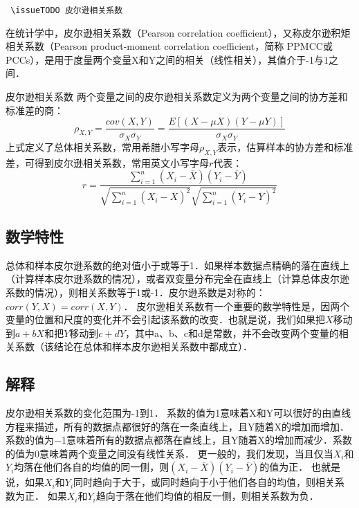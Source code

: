 
\verb | \issueTODO 皮尔逊相关系数|

在统计学中，皮尔逊相关系数（Pearson correlation coefficient），又称皮尔逊积矩相关系数（Pearson product-moment correlation coefficient，简称 PPMCC或PCCs），是用于度量两个变量X和Y之间的相关（线性相关），其值介于-1与1之间．
\begin{definition}{皮尔逊相关系数}\label{PearsR_def1}
两个变量之间的皮尔逊相关系数定义为两个变量之间的协方差和标准差的商：
\begin{equation}
\rho_{X,Y}=\frac{cov(X,Y)}{\sigma_{X}\sigma_{Y}}=\frac{E[(X-\mu X)(Y-\mu Y)]}{\sigma_{X}\sigma_{Y}}
\end{equation}
上式定义了总体相关系数，常用希腊小写字母$\rho_{X,Y}$表示，估算样本的协方差和标准差，可得到皮尔逊相关系数，常用英文小写字母$r$代表：
\begin{equation}
r=\frac{\sum_{i=1}^n\left(X_i-\overline X\right)\left(Y_i-\overline Y\right)}{\sqrt{\sum_{i=1}^n\left(X_i-\overline X\right)^2}\sqrt{\sum_{i=1}^n\left(Y_i-\overline Y\right)^2}}
\end{equation}
\end{definition}
\subsection{数学特性}
总体和样本皮尔逊系数的绝对值小于或等于1．如果样本数据点精确的落在直线上（计算样本皮尔逊系数的情况），或者双变量分布完全在直线上（计算总体皮尔逊系数的情况），则相关系数等于1或-1．皮尔逊系数是对称的： $corr(Y,X)=corr(X,Y)$．
皮尔逊相关系数有一个重要的数学特性是，因两个变量的位置和尺度的变化并不会引起该系数的改变．也就是说，我们如果把$X$移动到$a+bX$和把$Y$移动到$c+dY$，其中a、b、c和d是常数，并不会改变两个变量的相关系数（该结论在总体和样本皮尔逊相关系数中都成立）．
\subsection{解释}
皮尔逊相关系数的变化范围为-1到1． 系数的值为1意味着X和Y可以很好的由直线方程来描述，所有的数据点都很好的落在一条直线上，且Y随着X的增加而增加．系数的值为−1意味着所有的数据点都落在直线上，且Y随着X的增加而减少．系数的值为0意味着两个变量之间没有线性关系．
更一般的，我们发现，当且仅当$X_i$和$Y_i$均落在他们各自的均值的同一侧，则$(X_i-\overline X)(Y_i-\overline Y)$的值为正． 也就是说，如果$X_i$和$Y_i$同时趋向于大于，或同时趋向于小于他们各自的均值，则相关系数为正． 如果$X_i$和$Y_i$趋向于落在他们均值的相反一侧，则相关系数为负．